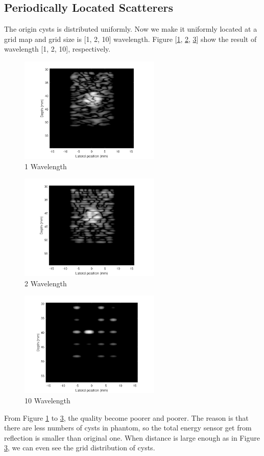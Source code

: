 \documentclass{article}
\begin{document}
\subsection{Periodically Located Scatterers}
The origin cysts is distributed uniformly. Now we make it uniformly located at a grid map and grid size is [1, 2, 10] wavelength.
Figure [\ref{fig:wave-1}, \ref{fig:wave-2}, \ref{fig:wave-10}] show the result of wavelength [1, 2, 10], respectively.
\begin{figure}[H]
	\centering
	\includegraphics[width = 0.6\textwidth]{src/wave_1.pdf}
	\caption{1 Wavelength}
	\label{fig:wave-1}
\end{figure}
\begin{figure}[H]
	\centering
	\includegraphics[width = 0.6\textwidth]{src/wave_2.pdf}
	\caption{2 Wavelength}
	\label{fig:wave-2}
\end{figure}
\begin{figure}[H]
	\centering
	\includegraphics[width = 0.6\textwidth]{src/wave_10.pdf}
	\caption{10 Wavelength}
	\label{fig:wave-10}
\end{figure}
From Figure \ref{fig:wave-1} to \ref{fig:wave-10}, the quality become poorer and poorer. The reason is that there are less numbers of cysts in
phantom, so the total energy sensor get from reflection is smaller than original one. When distance is large enough as in 
Figure \ref{fig:wave-10}, we can even see the grid distribution of cysts.
\end{document}
